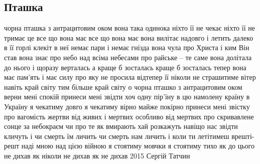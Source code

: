  
 
 
 
 

\subsection{Пташка}

чорна пташка з антрацитовим оком
вона така одинока
ніхто її не чекає ніхто її не тримає
це все що вона має
все що вона має
вона вилітає надовго і летить далеко
в її горлі клекіт
в неї немає пари і немає гнізда
вона чула про Христа
і ким Він став
вона знає про небо над всіма небесами
про райське – те саме
вона долітала до нього і щоразу верталась
а краще б зосталась
краще б зосталась
тепер вона має пам'ять і має силу
про яку не просила
відтепер її ніколи не страшитиме вітер
навіть край світу
тим більше край світу
о чорна пташко з антрацитовим оком
верни мені спокій
принеси мені звідти хоч одну пір'їну
в цю намолену країну
в Україну
я чекатиму довго я чекатиму вірно
майже покірно
принеси мені звістку про вагомість жертви
від живих і мертвих
особливо від мертвих
про скривавлене сонце за небокраєм
чи про те як вмирають
хай розкажуть навіщо нас звідти кличуть
і чи смерть їм личить
чи смерть нам личить
і коли ти летітимеш врешті-решт наді мною
над цією війною
я стоятиму мовчки я стоятиму тихо
як до цього не дихав
як ніколи не дихав
як не дихав
2015
Сергій Татчин
